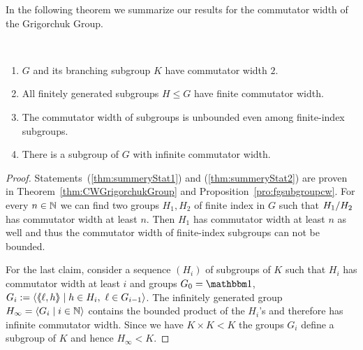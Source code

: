 \documentclass[a4paper,11pt]{amsart}
\begin{document}
In the following theorem we summarize our results for the commutator width of the Grigorchuk Group.
\begin{thm}\ 
 \begin{enumerate}
  \item $G$ and its branching subgroup $K$ have commutator width $2$. \label{thm:summeryStat1}
  \item All finitely generated subgroups $H\leq G$ have finite commutator width.\label{thm:summeryStat2}
  \item \label{thm:summeryStat3} The commutator width of subgroups is unbounded even among finite-index subgroups.
\item \label{thm:summeryStat4} There is a subgroup of $G$ with infinite commutator width.
 \end{enumerate}
\end{thm}
\begin{proof}
 Statements~(\ref{thm:summeryStat1}) and (\ref{thm:summeryStat2}) are proven in Theorem~\ref{thm:CWGrigorchukGroup} and Proposition~\ref{pro:fgsubgroupcw}.
 For every $n\in\mathbb{N}$ we can find two groups $H_1,H_2$ of finite index in $G$ such that ${H_1/H_2}$ has commutator
 width at least $n$. Then $H_1$ has commutator width at least $n$ as well and thus the commutator width of finite-index subgroups can not be bounded.

 For the last claim, consider a sequence $(H_i)$ of subgroups of $K$ such that
 $H_i$ has commutator width at least $i$ and groups $G_0=\id$,
 $G_{i}:=\langle \langle\negthickspace\langle\ell,h\rangle\negthickspace\rangle\mid h\in H_i,\ \ell\in G_{i-1} \rangle$. The 
 infinitely generated group $H_\infty = \langle G_i \mid i \in \mathbb{N}\rangle$
 contains the bounded product of the $H_i$'s and therefore has infinite
 commutator width. 
 Since we have $K\times K < K$ the groups $G_i$ define a subgroup of $K$ and 
 hence $H_\infty<K$.
  
\end{proof}
\end{document}
